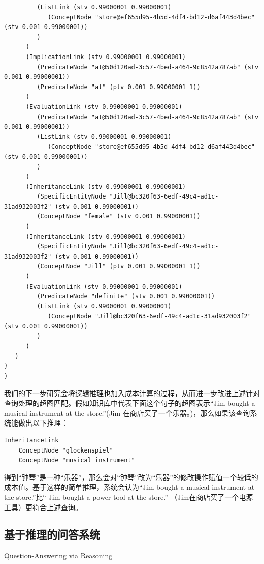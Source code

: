 {\begin{tiny}
\begin{lstlisting}
         (ListLink (stv 0.99000001 0.99000001)
            (ConceptNode "store@ef655d95-4b5d-4df4-bd12-d6af443d4bec" (stv 0.001 0.99000001))
         )
      )
      (ImplicationLink (stv 0.99000001 0.99000001)
         (PredicateNode "at@50d120ad-3c57-4bed-a464-9c8542a787ab" (stv 0.001 0.99000001))
         (PredicateNode "at" (ptv 0.001 0.99000001 1))
      )
      (EvaluationLink (stv 0.99000001 0.99000001)
         (PredicateNode "at@50d120ad-3c57-4bed-a464-9c8542a787ab" (stv 0.001 0.99000001))
         (ListLink (stv 0.99000001 0.99000001)
            (ConceptNode "store@ef655d95-4b5d-4df4-bd12-d6af443d4bec" (stv 0.001 0.99000001))
         )
      )
      (InheritanceLink (stv 0.99000001 0.99000001)
         (SpecificEntityNode "Jill@bc320f63-6edf-49c4-ad1c-31ad932003f2" (stv 0.001 0.99000001))
         (ConceptNode "female" (stv 0.001 0.99000001))
      )
      (InheritanceLink (stv 0.99000001 0.99000001)
         (SpecificEntityNode "Jill@bc320f63-6edf-49c4-ad1c-31ad932003f2" (stv 0.001 0.99000001))
         (ConceptNode "Jill" (ptv 0.001 0.99000001 1))
      )
      (EvaluationLink (stv 0.99000001 0.99000001)
         (PredicateNode "definite" (stv 0.001 0.99000001))
         (ListLink (stv 0.99000001 0.99000001)
            (ConceptNode "Jill@bc320f63-6edf-49c4-ad1c-31ad932003f2" (stv 0.001 0.99000001))
         )
      )
   )
)
)

\end{lstlisting}\end{tiny}}

我们的下一步研究会将逻辑推理也加入成本计算的过程，从而进一步改进上述针对查询处理的超图匹配。假如知识库中代表下面这个句子的超图表示“Jim bought a musical instrument at the store.”(Jim 在商店买了一个乐器。)，那么如果该查询系统能做出以下推理：

\begin{verbatim}
InheritanceLink
	ConceptNode "glockenspiel"
	ConceptNode "musical instrument"
\end{verbatim}

得到“钟琴”是一种“乐器”，那么会对“钟琴”改为“乐器”的修改操作赋值一个较低的成本值。基于这样的简单推理，系统会认为“Jim bought a musical instrument at the store.”比“ Jim bought a power tool at the store.” （Jim在商店买了一个电源工具）更符合上述查询。


\subsection{基于推理的问答系统}{Question-Answering via Reasoning}

